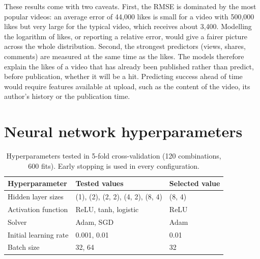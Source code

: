 \documentclass[11pt,a4paper]{article}
\begin{document}
These results come with two caveats. First, the RMSE is dominated by the most
popular videos: an average error of 44,000 likes is small for a video with
500,000 likes but very large for the typical video, which receives about 3,400.
Modelling the logarithm of likes, or reporting a relative error, would give a
fairer picture across the whole distribution. Second, the strongest predictors
(views, shares, comments) are measured at the same time as the likes. The
models therefore explain the likes of a video that has already been published
rather than predict, before publication, whether it will be a hit. Predicting
success ahead of time would require features available at upload, such as the
content of the video, its author's history or the publication time.

\appendix
\section{Neural network hyperparameters}

\begin{table}[h]
  \centering
  \small
  \begin{tabular}{lll}
    \toprule
    Hyperparameter & Tested values & Selected value \\
    \midrule
    Hidden layer sizes & (1), (2), (2, 2), (4, 2), (8, 4) & (8, 4) \\
    Activation function & ReLU, tanh, logistic & ReLU \\
    Solver & Adam, SGD & Adam \\
    Initial learning rate & 0.001, 0.01 & 0.01 \\
    Batch size & 32, 64 & 32 \\
    \bottomrule
  \end{tabular}
  \caption{Hyperparameters tested in 5-fold cross-validation (120 combinations,
  600 fits). Early stopping is used in every configuration.}
  \label{tab:hyper}
\end{table}
\end{document}
